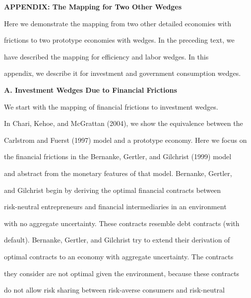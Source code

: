 \documentclass[fleqn,leqno,11pt]{article}
\begin{document}
\begin{center}

\textbf{APPENDIX: The Mapping for Two Other Wedges}

\end{center}



Here we demonstrate the mapping from two other detailed economies with

frictions to two prototype economies with wedges. In the preceding text, we

have described the mapping for efficiency and labor wedges. In this

appendix, we describe it for investment and government consumption wedges.



\bigskip



\begin{center}

\textbf{A. Investment Wedges Due to Financial Frictions}

\end{center}



We start with the mapping of financial frictions to investment wedges.



In Chari, Kehoe, and McGrattan (2004), we show the equivalence between the

Carlstrom and Fuerst (1997) model and a prototype economy. Here we focus on

the financial frictions in the Bernanke, Gertler, and Gilchrist (1999) model

and abstract from the monetary features of that model. Bernanke, Gertler,

and Gilchrist begin by deriving the optimal financial contracts between

risk-neutral entrepreneurs and financial intermediaries in an environment

with no aggregate uncertainty. These contracts resemble debt contracts (with

default). Bernanke, Gertler, and Gilchrist try to extend their derivation of

optimal contracts to an economy with aggregate uncertainty. The contracts

they consider are not optimal given the environment, because these contracts

do not allow risk sharing between risk-averse consumers and risk-neutral
\end{document}
